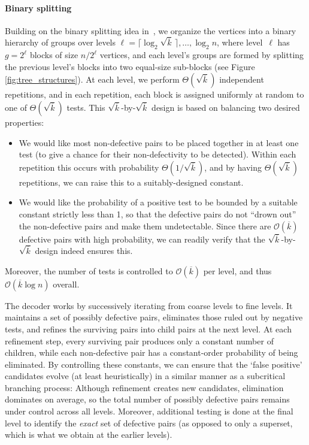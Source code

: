 \documentclass[journal]{IEEEtran}
\theoremstyle{definition}
\theoremstyle{definition}
\newcommand{\kb}{\overline{k}}
\newcommand{\bigO}{\mathcal{O}}
\begin{document}
\paragraph{Binary splitting}
Building on the binary splitting idea in~\cite{price2020fast,cheraghchi2020combinatorial}, we organize the
vertices into a binary hierarchy of groups over levels \(\ell=\lceil \log_2 \sqrt{\kb}\,\rceil,\ldots,\log_2 n\), where
level~\(\ell\) has \(g=2^\ell\) blocks of size \(n/2^{\ell}\) vertices, and each level's groups are formed by splitting the previous level's blocks into two equal-size sub-blocks (see Figure \ref{fig:tree_structures}). 
At each level, we perform \(\Theta(\sqrt{\kb})\) independent
repetitions, and in each repetition, each block is assigned uniformly at random to one of \(\Theta(\sqrt{\kb})\) tests. This \(\sqrt{\kb}\)-by-\(\sqrt{\kb}\) design is based on balancing two desired properties:
\begin{itemize}
    \item[(i)] We would like most non-defective pairs to be placed together in at least one test (to give a chance for their non-defectivity to be detected).  Within each repetition this occurs with probability \(\Theta(1/\sqrt{\kb})\), and by having \(\Theta(\sqrt{\kb})\) repetitions, we can raise this to a suitably-designed constant.
    \item[(ii)] We would like the probability of a positive test to be bounded by a suitable constant strictly less than 1, so that the defective pairs do not ``drown out'' the non-defective pairs and make them undetectable.  Since there are $\bigO(\kb)$ defective pairs with high probability, we can readily verify that the \(\sqrt{\kb}\)-by-\(\sqrt{\kb}\) design indeed ensures this.
\end{itemize}
Moreover, the number of tests is controlled to $\bigO(\kb)$ per level, and thus \(\bigO(\kb\log n)\) overall.


%

The decoder works by successively iterating from coarse levels to fine levels. It maintains a set of possibly defective pairs, eliminates those ruled
out by negative tests, and refines the surviving pairs into child pairs at the next level. At each refinement step, every surviving pair
produces only a constant number of children, while each non-defective pair has a constant-order probability of being eliminated.  By controlling these constants, we can ensure that the `false positive' 
candidates evolve (at least heuristically) in a similar manner as a subcritical branching process: Although refinement creates new candidates, elimination dominates on
average, so the total number of possibly defective pairs remains under control across all levels.   Moreover, additional testing is done at the final level to identify the \emph{exact} set of defective pairs (as opposed to only a superset, which is what we obtain at the earlier levels).
\end{document}
